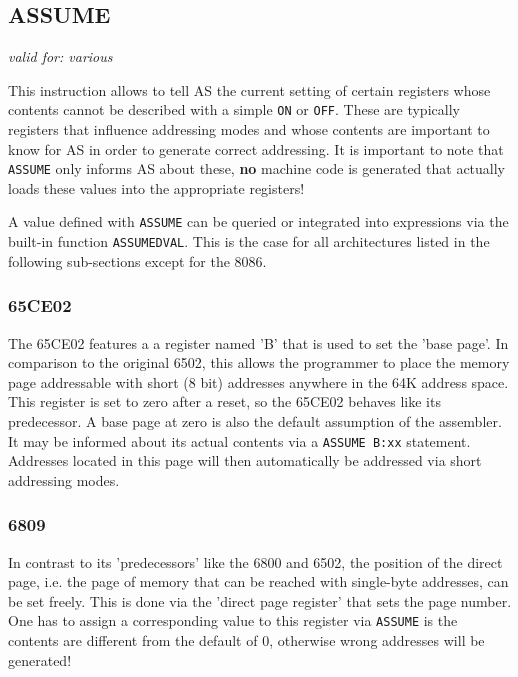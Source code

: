 \documentclass[12pt,twoside]{report}
\makeatletter
\newcommand{\bb}[1]{{\bf #1}}
\newcommand{\tty}[1]{{\tt #1}}
\newcommand{\ttindex}[1]{\index{#1@{\tt #1}}}
\newcommand{\asname}{{AS}}
\makeatother
\begin{document}

\subsection{ASSUME}
\ttindex{ASSUME}

{\em valid for: various}

This instruction allows to tell \asname{} the current setting of certain
registers whose contents cannot be described with a simple \tty{ON} or
\tty{OFF}.  These are typically registers that influence addressing modes
and whose contents are important to know for \asname{} in order to generate
correct addressing.  It is important to note that \tty{ASSUME} only
informs \asname{} about these, \bb{no} machine code is generated that actually
loads these values into the appropriate registers!

A value defined with \tty{ASSUME} can be queried or integrated
into expressions via the built-in function \tty{ASSUMEDVAL}.
This is the case for all architectures listed in the following
sub-sections except for the 8086.


\subsubsection{65CE02}

The 65CE02 features a a register named 'B' that is used to set the 'base page'.
In comparison to the original 6502, this allows the programmer to place the 
memory page addressable with short (8 bit) addresses anywhere in the 64K address
space.  This register is set to zero after a reset, so the 65CE02 behaves like
its predecessor.  A base page at zero is also the default assumption of the
assembler.  It may be informed about its actual contents via a \tty{ASSUME B:xx}
statement.  Addresses located in this page will then automatically be addressed
via short addressing modes.


\subsubsection{6809}

In contrast to its 'predecessors' like the 6800 and 6502, the position of
the direct page, i.e. the page of memory that can be reached with
single-byte addresses, can be set freely.  This is done via the 'direct
page register' that sets the page number.  One has to assign a
corresponding value to this register via \tty{ASSUME} is the contents are
different from the default of 0, otherwise wrong addresses will be
generated!
\end{document}
